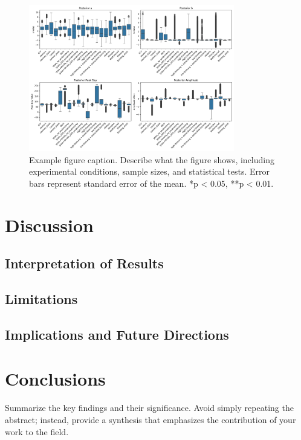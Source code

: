 \documentclass[12pt,a4paper]{article}
\begin{document}
\begin{figure}[H]
    \centering
    \includegraphics[width=0.8\textwidth]{"../other_params.png"}
    \caption{Example figure caption. Describe what the figure shows, including experimental conditions, sample sizes, and statistical tests. Error bars represent standard error of the mean. *p < 0.05, **p < 0.01.}
    \label{fig:other_params}
\end{figure}



\section{Discussion}

\subsection{Interpretation of Results}


\subsection{Limitations}

\subsection{Implications and Future Directions}



\section{Conclusions}

Summarize the key findings and their significance. Avoid simply repeating the abstract; instead, provide a synthesis that emphasizes the contribution of your work to the field.
\end{document}
